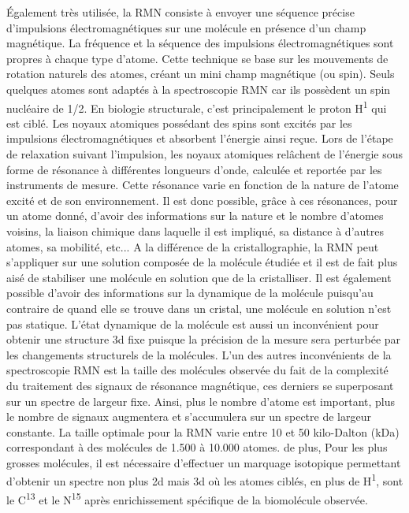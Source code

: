 Également très utilisée, la RMN consiste à envoyer une séquence précise d'impulsions électromagnétiques sur une molécule en présence d'un champ magnétique. La fréquence et la séquence des impulsions électromagnétiques sont propres à chaque type d'atome. Cette technique se base sur les mouvements de rotation naturels des atomes, créant un mini champ magnétique (ou spin). Seuls quelques atomes sont adaptés à la spectroscopie RMN car ils possèdent un spin nucléaire de 1/2. En biologie structurale, c'est principalement le proton H\textsuperscript{1} qui est ciblé. Les noyaux atomiques possédant des spins sont excités par les impulsions électromagnétiques et absorbent l'énergie ainsi reçue. Lors de l'étape de relaxation suivant l'impulsion, les noyaux atomiques relâchent de l'énergie sous forme de résonance à différentes longueurs d'onde, calculée et reportée par les instruments de mesure. Cette résonance varie en fonction de la nature de l'atome excité et de son environnement. Il est donc possible, grâce à ces résonances, pour un atome donné, d'avoir des informations sur la nature et le nombre d'atomes voisins, la liaison chimique dans laquelle il est impliqué, sa distance à d'autres atomes, sa mobilité, etc... A la différence de la cristallographie, la RMN peut s'appliquer sur une solution composée de la molécule étudiée et il est de fait plus aisé de stabiliser une molécule en solution que de la cristalliser. Il est également possible d'avoir des informations sur la dynamique de la molécule puisqu'au contraire de quand elle se trouve dans un cristal, une molécule en solution n'est pas statique.
L'état dynamique de la molécule est aussi un inconvénient pour obtenir une structure 3d fixe puisque la précision de la mesure sera perturbée par les changements structurels de la molécules. L'un des autres inconvénients de la spectroscopie RMN est la taille des molécules observée du fait de la complexité du traitement des signaux de résonance magnétique, ces derniers se superposant sur un spectre de largeur fixe. Ainsi, plus le nombre d'atome est important, plus le nombre de signaux augmentera et s'accumulera sur un spectre de largeur constante. La taille optimale pour la RMN varie entre 10 et 50 kilo-Dalton (kDa) correspondant à des molécules de 1.500 à 10.000 atomes. de plus, Pour les plus grosses molécules, il est nécessaire d'effectuer un marquage isotopique permettant d'obtenir un spectre non plus 2d mais 3d où les atomes ciblés, en plus de H\textsuperscript{1}, sont le C\textsuperscript{13} et le N\textsuperscript{15} après enrichissement spécifique de la biomolécule observée.

